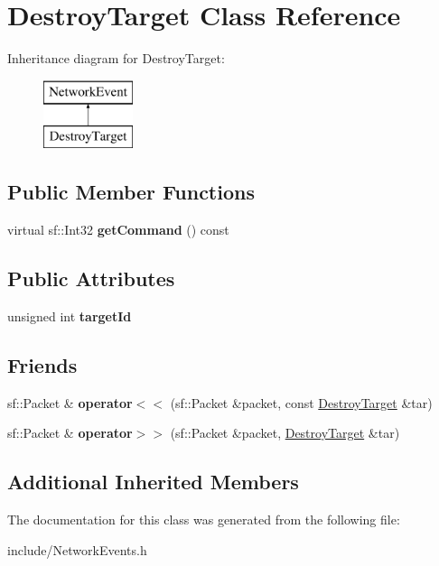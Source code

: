 \hypertarget{class_destroy_target}{\section{Destroy\-Target Class Reference}
\label{class_destroy_target}
}
Inheritance diagram for Destroy\-Target\-:\begin{figure}[H]
\begin{center}
\leavevmode
\includegraphics[height=2.000000cm]{class_destroy_target}
\end{center}
\end{figure}
\subsection*{Public Member Functions}
\begin{DoxyCompactItemize}
\item 
\hypertarget{class_destroy_target_a77ec6bb85e33331c8c4b518b859f0e84}{virtual sf\-::\-Int32 {\bfseries get\-Command} () const }\label{class_destroy_target_a77ec6bb85e33331c8c4b518b859f0e84}

\end{DoxyCompactItemize}
\subsection*{Public Attributes}
\begin{DoxyCompactItemize}
\item 
\hypertarget{class_destroy_target_ad7030853e35d7e116d1d75cecab70a0f}{unsigned int {\bfseries target\-Id}}\label{class_destroy_target_ad7030853e35d7e116d1d75cecab70a0f}

\end{DoxyCompactItemize}
\subsection*{Friends}
\begin{DoxyCompactItemize}
\item 
\hypertarget{class_destroy_target_a8e96d469a4fdf0616c50c106fe97bc66}{sf\-::\-Packet \& {\bfseries operator$<$$<$} (sf\-::\-Packet \&packet, const \hyperlink{class_destroy_target}{Destroy\-Target} \&tar)}\label{class_destroy_target_a8e96d469a4fdf0616c50c106fe97bc66}

\item 
\hypertarget{class_destroy_target_a0cf94fe4875f97e648154b9eb27adc46}{sf\-::\-Packet \& {\bfseries operator$>$$>$} (sf\-::\-Packet \&packet, \hyperlink{class_destroy_target}{Destroy\-Target} \&tar)}\label{class_destroy_target_a0cf94fe4875f97e648154b9eb27adc46}

\end{DoxyCompactItemize}
\subsection*{Additional Inherited Members}


The documentation for this class was generated from the following file\-:\begin{DoxyCompactItemize}
\item 
include/Network\-Events.\-h\end{DoxyCompactItemize}
